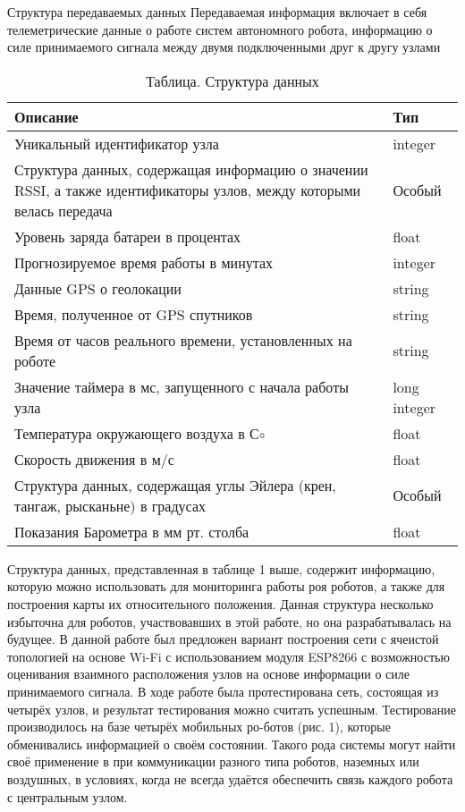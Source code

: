 Структура передаваемых данных
Передаваемая информация включает в себя телеметрические данные о работе систем автономного робота, информацию о силе принимаемого сигнала между двумя подключенными друг к другу узлами

\begin{table} [htbp]
	\centering
	\caption{ Таблица. Структура данных }
	\label{Ts0Sib5}%
	\begin{tabular}{|p{3.3in}|p{1.0in}|} \hline 
		Описание & Тип \\ \hline 
		Уникальный идентификатор узла & integer \\ \hline 
		Структура данных, содержащая информацию о значении RSSI, а также идентификаторы узлов, между которыми велась передача & Особый \\ \hline 
		Уровень заряда батареи в процентах & float \\ \hline 
		Прогнозируемое время работы в минутах & integer \\ \hline 
		Данные GPS о геолокации & string \\ \hline 
		Время, полученное от GPS спутников & string \\ \hline 
		Время от часов реального времени, установленных на роботе & string \\ \hline 
		Значение таймера в мс, запущенного с начала работы узла & long integer \\ \hline 
		Температура окружающего воздуха в С$\circ$ & float \\ \hline 
		Скорость движения в м/с & float \\ \hline 
		Структура данных, содержащая углы Эйлера (крен, тангаж, рысканьне) в градусах & Особый \\ \hline 
		Показания Барометра в мм рт. столба & float \\ \hline 
	\end{tabular}
\end{table}

Структура данных, представленная в таблице 1 выше, содержит информацию, которую можно использовать для мониторинга работы роя роботов, а также для построения карты их относительного положения. Данная структура несколько избыточна для роботов, участвовавших в этой работе, но она разрабатывалась на будущее.
В данной работе был предложен вариант построения сети с ячеистой топологией на основе Wi-Fi с использованием модуля ESP8266 с возможностью оценивания взаимного расположения узлов на основе информации о силе принимаемого сигнала. В ходе работе была протестирована сеть, состоящая из четырёх узлов, и результат тестирования можно считать успешным. Тестирование производилось на базе четырёх мобильных ро-ботов (рис. 1), которые обменивались информацией о своём состоянии.
Такого рода системы могут найти своё применение в при коммуникации разного типа роботов, наземных или воздушных, в условиях, когда не всегда удаётся обеспечить связь каждого робота с центральным узлом.

